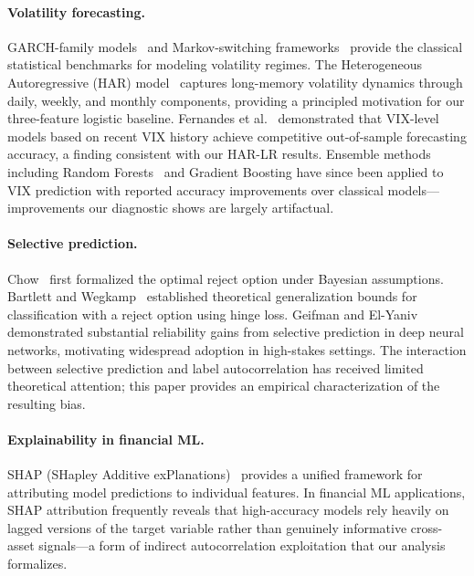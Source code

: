 \documentclass[runningheads]{llncs}
\begin{document}
\paragraph{Volatility forecasting.}
GARCH-family models~\cite{bollerslev1986} and Markov-switching
frameworks~\cite{hamilton1989} provide the classical statistical benchmarks for
modeling volatility regimes. The Heterogeneous Autoregressive (HAR)
model~\cite{corsi2009} captures long-memory volatility dynamics through daily,
weekly, and monthly components, providing a principled motivation for our
three-feature logistic baseline. Fernandes et al.~\cite{fernandes2014}
demonstrated that VIX-level models based on recent VIX history achieve
competitive out-of-sample forecasting accuracy, a finding consistent with
our HAR-LR results. Ensemble methods including Random Forests~\cite{breiman2001}
and Gradient Boosting have since been applied to VIX prediction with reported
accuracy improvements over classical models---improvements our diagnostic
shows are largely artifactual.

\paragraph{Selective prediction.}
Chow~\cite{chow1970} first formalized the optimal reject option under Bayesian
assumptions. Bartlett and Wegkamp~\cite{bartlett2008} established theoretical
generalization bounds for classification with a reject option using hinge
loss. Geifman and El-Yaniv~\cite{geifman2017} demonstrated substantial
reliability gains from selective prediction in deep neural networks, motivating
widespread adoption in high-stakes settings. The interaction between selective
prediction and label autocorrelation has received limited theoretical attention;
this paper provides an empirical characterization of the resulting bias.

\paragraph{Explainability in financial ML.}
SHAP (SHapley Additive exPlanations)~\cite{lundberg2017} provides a unified
framework for attributing model predictions to individual features. In financial
ML applications, SHAP attribution frequently reveals that high-accuracy models
rely heavily on lagged versions of the target variable rather than genuinely
informative cross-asset signals---a form of indirect autocorrelation
exploitation that our analysis formalizes.
\end{document}
